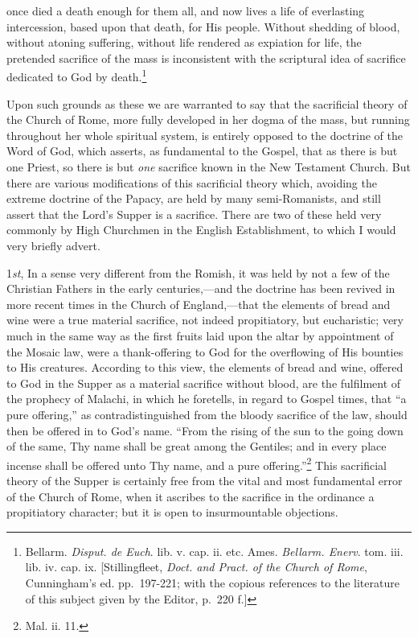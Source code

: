 \documentclass[english,]{book}
\begin{document}
once died a death enough for them all, and now lives a life of everlasting intercession, based upon that death, for His people. Without shedding of blood, without atoning suffering, without life rendered as expiation for life, the pretended sacrifice of the mass is inconsistent with the scriptural idea of sacrifice dedicated to God by death.\footnote{Bellarm. \emph{Disput. de Euch}. lib. v. cap. ii. etc. Ames. \emph{Bellarm. Enerv}. tom. iii. lib. iv. cap. ix. {[}Stillingfleet, \emph{Doct. and Pract. of the Church of Rome}, Cunningham's ed. pp.~197-221; with the copious references to the literature of this subject given by the Editor, p.~220 f.{]}}

Upon such grounds as these we are warranted to say that the sacrificial theory of the Church of Rome, more fully developed in her dogma of the mass, but running throughout her whole spiritual system, is entirely opposed to the doctrine of the Word of God, which asserts, as fundamental to the Gospel, that as there is but one Priest, so there is but \emph{one} sacrifice known in the New Testament Church. But there are various modifications of this sacrificial theory which, avoiding the extreme doctrine of the Papacy, are held by many semi-Romanists, and still assert that the Lord's Supper is a sacrifice. There are two of these held very commonly by High Churchmen in the English Establishment, to which I would very briefly advert.

1\emph{st}, In a sense very different from the Romish, it was held by not a few of the Christian Fathers in the early centuries,---and the doctrine has been revived in more recent times in the Church of England,---that the elements of bread and wine were a true material sacrifice, not indeed propitiatory, but eucharistic; very much in the same way as the first fruits laid upon the altar by appointment of the Mosaic law, were a thank-offering to God for the overflowing of His bounties to His creatures. According to this view, the elements of bread and wine, offered to God in the Supper as a material sacrifice without blood, are the fulfilment of the prophecy of Malachi, in which he foretells, in regard to Gospel times, that ``a pure offering,'' as contradistinguished from the bloody sacrifice of the law, should then be offered in to God's name. ``From the rising of the sun to the going down of the same, Thy name shall be great among the Gentiles; and in every place incense shall be offered unto Thy name, and a pure offering.''\footnote{Mal. ii. 11.} This sacrificial theory of the Supper is certainly free from the vital and most fundamental error of the Church of Rome, when it ascribes to the sacrifice in the ordinance a propitiatory character; but it is open to insurmountable objections.
\end{document}
